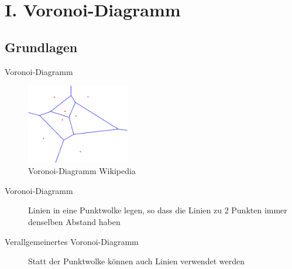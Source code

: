\section{I. Voronoi-Diagramm}
\subsection{Grundlagen}
\begin{frame}{Voronoi-Diagramm}
 \begin{figure}[h]
 \centering
 \includegraphics[width=0.4\textwidth]{./material/voronoi-step1-1.png}
 \caption{Voronoi-Diagramm Wikipedia}
\end{figure}
\begin{description}
 \item[Voronoi-Diagramm] Linien in eine Punktwolke legen, so dass die Linien zu 2 Punkten immer denselben Abstand haben
 \item[Verallgemeinertes Voronoi-Diagramm] Statt der Punktwolke können auch Linien verwendet werden
\end{description}

\end{frame}

